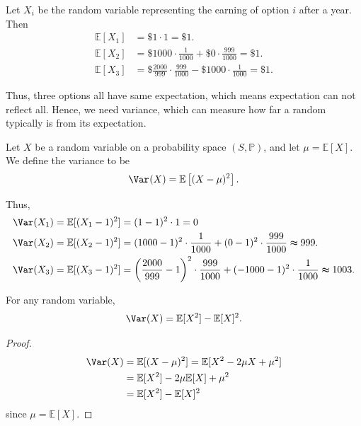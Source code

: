 Let \(X_i\) be the random variable representing the earning of option \(i\) after a year. Then 
\begin{align*}
    \mathbb{E} [X_1] &= \$ 1 \cdot 1 = \$ 1. \\
    \mathbb{E} [X_2] &= \$ 1000 \cdot \frac{1}{1000} + \$ 0 \cdot \frac{999}{1000} = \$ 1. \\
    \mathbb{E} [X_3] &= \$ \frac{2000}{999} \cdot \frac{999}{1000} - \$ 1000 \cdot \frac{1}{1000} = \$ 1.
\end{align*} 

Thus, three options all have same expectation, which means expectation can not reflect all. Hence, we need variance, which can measure how far a random typically is from its expectation.

\begin{definition}[Variance]
    Let \(X\) be a random variable on a probability space \((S, \mathbb{P} )\), and let \(\mu = \mathbb{E} [X]\). We define the variance to be 
    \[
        \Var_{}(X) = \mathbb{E} \left[ (X - \mu )^2 \right]. 
    \]   
\end{definition}

Thus, 
\begin{align*}
    \Var (X_1) &= \mathbb{E} [(X_1 - 1)^2] = (1 - 1)^2 \cdot 1 = 0 \\
    \Var (X_2) &= \mathbb{E} [(X_2 - 1)^2] = (1000 - 1)^2 \cdot \frac{1}{1000} + (0 - 1)^2 \cdot \frac{999}{1000} \thickapprox 999. \\
    \Var (X_3) &= \mathbb{E} [(X_3 - 1)^2] = \left( \frac{2000}{999} - 1 \right)^2 \cdot \frac{999}{1000} + (-1000 - 1)^2 \cdot \frac{1}{1000} \thickapprox 1003. 
\end{align*}

\begin{claim}
    For any random variable, 
    \[
        \Var(X) = \mathbb{E} [X^2] - \mathbb{E} [X]^2.
    \]
\end{claim}

\begin{proof}
    \begin{align*}
        \Var (X) &= \mathbb{E} [(X - \mu )^2] = \mathbb{E} [X^2 - 2 \mu X + \mu ^2] \\
        &= \mathbb{E} [X^2] - 2\mu \mathbb{E} [X] + \mu ^2 \\
        &= \mathbb{E} [X^2] - \mathbb{E} [X]^2 
    \end{align*}
    since \(\mu = \mathbb{E} [X]\). 
\end{proof}

